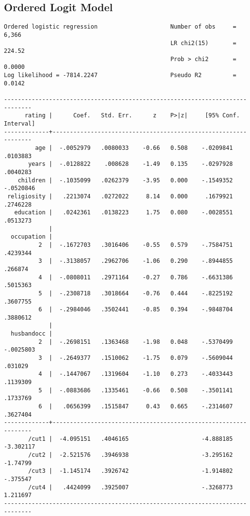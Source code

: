 \documentclass{article}
\begin{document}
\newpage
\hypertarget{ologit}{\subsection*{Ordered Logit Model}}
\begin{verbatim}
Ordered logistic regression                     Number of obs     =      6,366
                                                LR chi2(15)       =     224.52
                                                Prob > chi2       =     0.0000
Log likelihood = -7814.2247                     Pseudo R2         =     0.0142

------------------------------------------------------------------------------
      rating |      Coef.   Std. Err.      z    P>|z|     [95% Conf. Interval]
-------------+----------------------------------------------------------------
         age |  -.0052979   .0080033    -0.66   0.508    -.0209841    .0103883
       years |  -.0128822    .008628    -1.49   0.135    -.0297928    .0040283
    children |  -.1035099   .0262379    -3.95   0.000    -.1549352   -.0520846
 religiosity |   .2213074   .0272022     8.14   0.000     .1679921    .2746228
   education |   .0242361   .0138223     1.75   0.080    -.0028551    .0513273
             |
  occupation |
          2  |  -.1672703   .3016406    -0.55   0.579    -.7584751    .4239344
          3  |  -.3138057   .2962706    -1.06   0.290    -.8944855     .266874
          4  |  -.0808011   .2971164    -0.27   0.786    -.6631386    .5015363
          5  |  -.2308718   .3018664    -0.76   0.444    -.8225192    .3607755
          6  |  -.2984046   .3502441    -0.85   0.394    -.9848704    .3880612
             |
  husbandocc |
          2  |  -.2698151   .1363468    -1.98   0.048    -.5370499   -.0025803
          3  |  -.2649377   .1510062    -1.75   0.079    -.5609044     .031029
          4  |  -.1447067   .1319604    -1.10   0.273    -.4033443    .1139309
          5  |  -.0883686   .1335461    -0.66   0.508    -.3501141    .1733769
          6  |   .0656399   .1515847     0.43   0.665    -.2314607    .3627404
-------------+----------------------------------------------------------------
       /cut1 |  -4.095151   .4046165                     -4.888185   -3.302117
       /cut2 |  -2.521576   .3946938                     -3.295162    -1.74799
       /cut3 |  -1.145174   .3926742                     -1.914802    -.375547
       /cut4 |   .4424099   .3925007                     -.3268773    1.211697
------------------------------------------------------------------------------
\end{verbatim}
\end{document}
